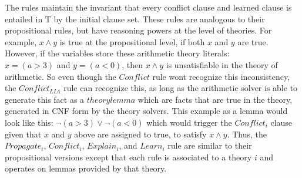 \documentclass{report}
\begin{document}
The rules maintain the invariant that every conflict clause and learned 
clause is entailed in T by the initial clause set.
These rules are analogous to their propositional rules, but 
have reasoning powers at the level of theories. For example, 
$x \land y$ is true at the propositional level, if both 
$x$ and $y$ are true. However, if the variables store these 
arithmetic theory literals: \\
$x = (a > 3)$ and $y = (a < 0)$, then $x \land y$ is 
unsatisfiable in the theory of arithmetic. So even though 
the $Conflict$ rule wont recognize this inconsistency, 
the $Conflict_{LIA}$ rule can recognize this, as long as 
the arithmetic solver is able to generate this fact as a 
$theory lemma$ which are facts that are true in the theory, 
generated in CNF form by the theory solvers. This example
as a lemma would look like this:
$\neg (a > 3) \lor \neg (a < 0)$ which would trigger the 
$Conflict_i$ clause given that $x$ and $y$ above are assigned 
to true, to satisfy $x \land y$. Thus, the $Propagate_i$, 
$Conflict_i$, $Explain_i$, and $Learn_i$ rule are similar 
to their propositional versions except that each rule is 
associated to a theory $i$ and operates on lemmas 
provided by that theory. 
\end{document}

